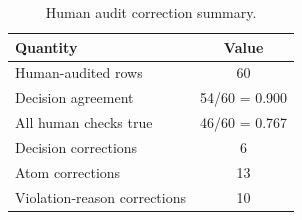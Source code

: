 \begin{table}[h]
\centering
\small
\caption{Human audit correction summary.}
\label{tab:human-audit-summary}
\begin{tabular}{lc}
\toprule
Quantity & Value \\
\midrule
Human-audited rows & 60 \\
Decision agreement & 54/60 = 0.900 \\
All human checks true & 46/60 = 0.767 \\
Decision corrections & 6 \\
Atom corrections & 13 \\
Violation-reason corrections & 10 \\
\bottomrule
\end{tabular}
\end{table}
